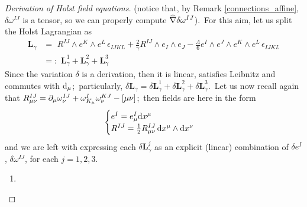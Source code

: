 \begin{proof}[Derivation of Holst field equations]
{    } (notice that, by Remark \ref{connections_affine}, $\delta\omega^{IJ}$ is a tensor, so we can properly compute $\widehat{\nabla}\delta\omega^{IJ}$).\, For this aim, let us split the Holst Lagrangian as 
    \begin{align*}
        \mathbf{L}_\gamma&=\,\,R^{IJ}\wedge e^K\wedge e^L\,\epsilon_{IJKL}+\frac{2}{\gamma}R^{IJ}\wedge e_I\wedge e_J-\frac{\Lambda}{6}e^I\wedge e^J\wedge e^K\wedge e^L\,\epsilon_{IJKL}\\
        &=:\,\,\mathbf{L}^1_\gamma+\mathbf{L}^2_\gamma+\mathbf{L}^3_\gamma
    \end{align*}
    Since the variation $\delta$ is a derivation, then it is linear, satisfies Leibnitz and commutes with $\text{\normalfont d}_\mu$;\, particularly, $\delta\mathbf{L}_\gamma=\delta\mathbf{L}^1_\gamma+\delta\mathbf{L}^2_\gamma+\delta\mathbf{L}^3_\gamma$.\, Let us now recall again that $R^{IJ}_{\mu\nu}=\partial_\mu\omega_\nu^{IJ}+\omega^I_{K_\mu}\omega^{KJ}_\nu-[\mu\nu]$;\, then fields are here in the form 
    $$\begin{cases}
        e^I=e^I_\mu\text{\normalfont d} x^\mu\\
        R^{IJ}=\frac{1}{2}R^{IJ}_{\mu\nu}\,\text{\normalfont d} x^\mu\wedge\text{\normalfont d} x^\nu
    \end{cases}$$
    and we are left with expressing each $\delta\mathbf{L}^j_\gamma$ as an explicit (linear) combination of $\delta e^I$, $\delta\omega^{IJ}$, for each $j=1,2,3.$

    \begin{enumerate}
        \item 
    

\end{enumerate}
\end{proof}
